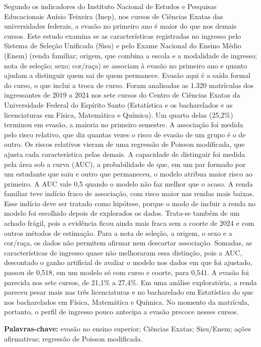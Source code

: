 \documentclass[12pt,a4paper]{article}
\begin{document}
Segundo os indicadores do Instituto Nacional de Estudos e Pesquisas Educacionais Anísio Teixeira (Inep), nos cursos de Ciências Exatas das universidades federais, a evasão no primeiro ano é maior do que nos demais cursos. Este estudo examina se as características registradas no ingresso pelo Sistema de Seleção Unificada (Sisu) e pelo Exame Nacional do Ensino Médio (Enem) (renda familiar; origem, que combina a escola e a modalidade de ingresso; nota de seleção; sexo; cor/raça) se associam à evasão no primeiro ano e quanto ajudam a distinguir quem sai de quem permanece. Evasão aqui é a saída formal do curso, o que inclui a troca de curso. Foram analisadas as 1.320 matrículas dos ingressantes de 2019 a 2024 nos sete cursos do Centro de Ciências Exatas da Universidade Federal do Espírito Santo (Estatística e os bacharelados e as licenciaturas em Física, Matemática e Química). Um quarto delas (25,2\%) terminou em evasão, a maioria no primeiro semestre. A associação foi medida pelo risco relativo, que diz quantas vezes o risco de evasão de um grupo é o de outro. Os riscos relativos vieram de uma regressão de Poisson modificada, que ajusta cada característica pelas demais. A capacidade de distinguir foi medida pela área sob a curva (AUC), a probabilidade de que, em um par formado por um estudante que saiu e outro que permaneceu, o modelo atribua maior risco ao primeiro. A AUC vale 0,5 quando o modelo não faz melhor que o acaso. A renda familiar teve indício fraco de associação, com risco maior nas rendas mais baixas. Esse indício deve ser tratado como hipótese, porque o modo de incluir a renda no modelo foi escolhido depois de explorados os dados. Trata-se também de um achado frágil, pois a evidência ficou ainda mais fraca sem a coorte de 2024 e com outros métodos de estimação. Para a nota de seleção, a origem, o sexo e a cor/raça, os dados não permitem afirmar nem descartar associação. Somadas, as características de ingresso quase não melhoraram essa distinção, pois a AUC, descontado o ganho artificial de avaliar o modelo nos dados em que foi ajustado, passou de 0,518, em um modelo só com curso e coorte, para 0,541. A evasão foi parecida nos sete cursos, de 21,1\% a 27,4\%. Em uma análise exploratória, a renda pareceu pesar mais nas três licenciaturas e no bacharelado em Estatística do que nos bacharelados em Física, Matemática e Química. No momento da matrícula, portanto, o perfil de ingresso pouco antecipa a evasão precoce nesses cursos.

\noindent\textbf{Palavras-chave:} evasão no ensino superior; Ciências Exatas;
Sisu/Enem; ações afirmativas; regressão de Poisson modificada.
\end{document}
